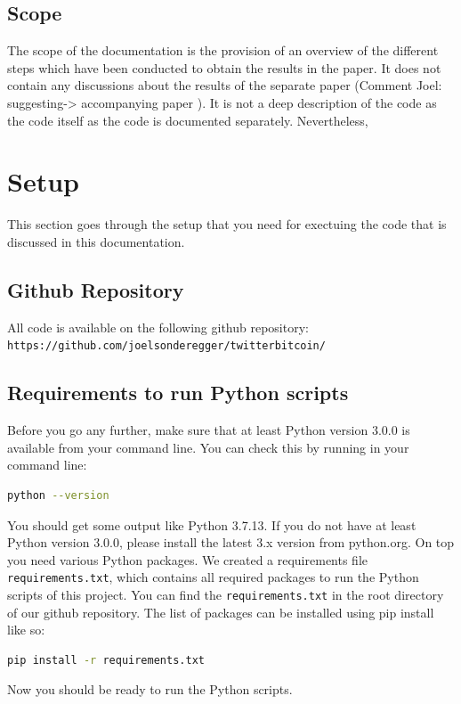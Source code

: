 \documentclass[a4paper,12pt]{article}
\begin{document}
\begin{spacing}{1.2}
\subsection{Scope}
The scope of the documentation is the provision of an overview of the different steps which have been conducted to obtain the results in the paper. It does not contain any discussions about the results of the separate paper (Comment Joel: suggesting-> accompanying paper ). It is not a deep description of the code as the code itself as the code is documented separately. Nevertheless, 
\clearpage

\section{Setup}
This section goes through the setup that you need for exectuing the code that is discussed in this documentation.
\subsection{Github Repository}
All code is available on the following github repository:
\newline
\verb|https://github.com/joelsonderegger/twitterbitcoin/|
\subsection{Requirements to run Python scripts}
Before you go any further, make sure that at least Python version 3.0.0 is available from your command line. You can check this by running in your command line:
\begin{lstlisting}[language=bash]
    python --version
\end{lstlisting}

You should get some output like Python 3.7.13. If you do not have at least Python version 3.0.0, please install the latest 3.x version from python.org.
\newline \newline
On top you need various Python packages. We created a  requirements file \verb|requirements.txt|, which contains all required packages to run the Python scripts of this project. You can find the  \verb|requirements.txt| in the root directory of our github repository. The list of packages can be installed using pip install like so:

\begin{lstlisting}[language=bash]
    pip install -r requirements.txt
\end{lstlisting}
Now you should be ready to run the Python scripts.


\end{spacing}
\end{document}
